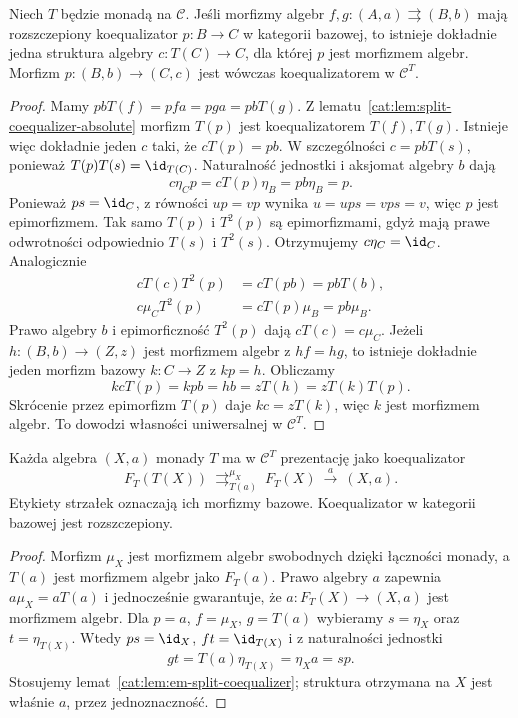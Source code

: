 \begin{lemat}\label{cat:lem:em-split-coequalizer}
Niech $T$ będzie monadą na $\mathcal C$. Jeśli morfizmy algebr
$f,g:(A,a)\rightrightarrows(B,b)$ mają rozszczepiony koequalizator
$p:B\to C$ w kategorii bazowej, to istnieje dokładnie jedna struktura
algebry $c:T(C)\to C$, dla której $p$ jest morfizmem algebr.
Morfizm $p:(B,b)\to(C,c)$ jest wówczas koequalizatorem w $\mathcal C^T$.
\end{lemat}
\begin{proof}
Mamy $pbT(f)=pfa=pga=pbT(g)$. Z lematu~\ref{cat:lem:split-coequalizer-absolute} morfizm $T(p)$ jest koequalizatorem $T(f),T(g)$. Istnieje więc dokładnie jeden $c$ taki, że $cT(p)=pb$. W szczególności $c=pbT(s)$, ponieważ $T(p)T(s)=\id_{T(C)}$.
Naturalność jednostki i aksjomat algebry $b$ dają
\[
 c\eta_Cp=cT(p)\eta_B=pb\eta_B=p.
\]
Ponieważ $ps=\id_C$, z równości $u p=v p$ wynika $u=u p s=v p s=v$, więc $p$ jest epimorfizmem. Tak samo $T(p)$ i $T^2(p)$ są epimorfizmami, gdyż mają prawe odwrotności odpowiednio $T(s)$ i $T^2(s)$. Otrzymujemy $c\eta_C=\id_C$.
Analogicznie
\begin{align*}
 cT(c)T^2(p)&=cT(pb)=pbT(b),\\
 c\mu_C T^2(p)&=cT(p)\mu_B=pb\mu_B.
\end{align*}
Prawo algebry $b$ i epimorficzność $T^2(p)$ dają $cT(c)=c\mu_C$.
Jeżeli $h:(B,b)\to(Z,z)$ jest morfizmem algebr z $hf=hg$, to istnieje dokładnie jeden morfizm bazowy $k:C\to Z$ z $kp=h$. Obliczamy
\[
 kcT(p)=kpb=hb=zT(h)=zT(k)T(p).
\]
Skrócenie przez epimorfizm $T(p)$ daje $kc=zT(k)$, więc $k$ jest morfizmem algebr. To dowodzi własności uniwersalnej w $\mathcal C^T$.
\end{proof}

\begin{lemat}\label{cat:lem:canonical-algebra-presentation}
Każda algebra $(X,a)$ monady $T$ ma w $\mathcal C^T$ prezentację jako koequalizator
\[
 F_T(T(X))\ \mathop{\rightrightarrows}^{\mu_X}_{T(a)}\
 F_T(X)\ \xrightarrow{a}\ (X,a).
\]
Etykiety strzałek oznaczają ich morfizmy bazowe. Koequalizator w kategorii bazowej jest rozszczepiony.
\end{lemat}
\begin{proof}
Morfizm $\mu_X$ jest morfizmem algebr swobodnych dzięki łączności monady, a $T(a)$ jest morfizmem algebr jako $F_T(a)$. Prawo algebry $a$ zapewnia $a\mu_X=aT(a)$ i jednocześnie gwarantuje, że $a:F_T(X)\to(X,a)$ jest morfizmem algebr.
Dla $p=a$, $f=\mu_X$, $g=T(a)$ wybieramy $s=\eta_X$ oraz $t=\eta_{T(X)}$. Wtedy $ps=\id_X$, $ft=\id_{T(X)}$ i z naturalności jednostki
\[
 gt=T(a)\eta_{T(X)}=\eta_Xa=sp.
\]
Stosujemy lemat~\ref{cat:lem:em-split-coequalizer}; struktura otrzymana na $X$ jest właśnie $a$, przez jednoznaczność.
\end{proof}

